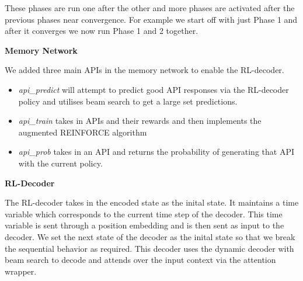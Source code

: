 These phases are run one after the other and more phases are activated after the previous phases near convergence. For example we start off with just Phase 1 and after it converges we now run Phase 1 and 2 together.

\noindent\textbf{Memory Network}

We added three main APIs in the memory network to enable the RL-decoder. 

\begin{itemize}
	\item \emph{api\_predict} will attempt to predict good API responses via the RL-decoder policy and utilises beam search to get a large set predictions.
	\item \emph{api\_train} takes in APIs and their rewards and then implements the augmented REINFORCE algorithm
	\item \emph{api\_prob} takes in an API and returns the probability of generating that API with the current policy.
\end{itemize}

\noindent\textbf{RL-Decoder}

The RL-decoder takes in the encoded state as the inital state. It maintains a time variable which corresponds to the current time step of the decoder. This time variable is sent through a position embedding and is then sent as input to the decoder. We set the next state of the decoder as the inital state so that we break the sequential behavior as required. This decoder uses the dynamic decoder with beam search to decode and attends over the input context via the attention wrapper.

